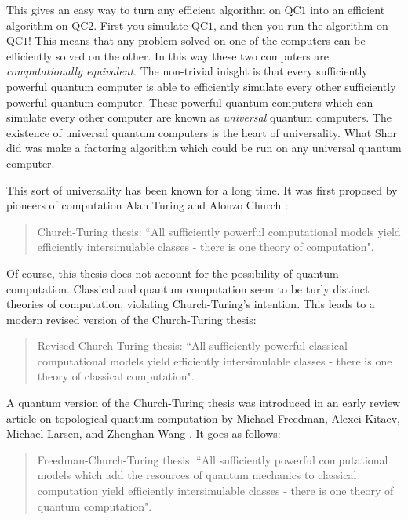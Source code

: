 \documentclass{article}
\theoremstyle{definition}
\newcommand{\0}{\left|0\right>}
\newcommand{\1}{\left|1\right>}
\numberwithin{figure}{section}
\begin{document}
This gives an easy way to turn any efficient algorithm on $\text{QC}1$ into an efficient algorithm on $\text{QC}2$. First you simulate $\text{QC}1$, and then you run the algorithm on $\text{QC}1$! This means that any problem solved on one of the computers can be efficiently solved on the other. In this way these two computers are \textit{computationally equivalent}. The non-trivial inisght is that every sufficiently powerful quantum computer is able to efficiently simulate every other sufficiently powerful quantum computer. These powerful quantum computers which can simulate every other computer are known as \textit{universal} quantum computers. The existence of universal quantum computers is the heart of universality. What Shor did was make a factoring algorithm which could be run on any universal quantum computer.

This sort of universality has been known for a long time. It was first proposed by pioneers of computation Alan Turing and Alonzo Church \cite{turing1939systems, copeland1997church}:

\begin{quote}
Church-Turing thesis: ``All sufficiently powerful computational models yield efficiently intersimulable classes - there is one theory of computation".
\end{quote}

Of course, this thesis does not account for the possibility of quantum computation. Classical and quantum computation seem to be turly distinct theories of computation, violating Church-Turing's intention. This leads to a modern revised version of the Church-Turing thesis:

\begin{quote}
Revised Church-Turing thesis: ``All sufficiently powerful classical computational models yield efficiently intersimulable classes - there is one theory of classical computation".
\end{quote}

A quantum version of the Church-Turing thesis was introduced in an early review article on topological quantum computation by Michael Freedman, Alexei Kitaev, Michael Larsen, and Zhenghan Wang \cite{freedman2003topological}. It goes as follows:

\begin{quote}
Freedman-Church-Turing thesis: ``All sufficiently powerful computational models which add the resources of quantum mechanics to classical computation yield efficiently intersimulable classes - there is one theory of quantum computation".
\end{quote}
\end{document}
